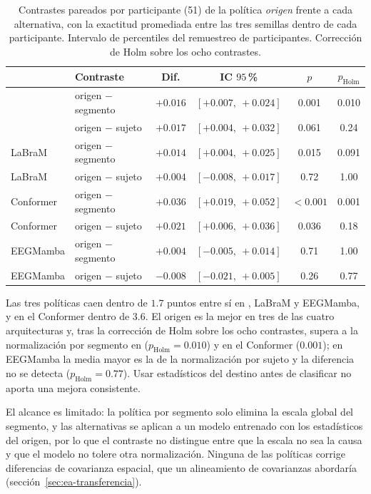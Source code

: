 \begin{table}[H]
\centering
\caption{Contrastes pareados por participante (51) de la política \emph{origen} frente a cada
alternativa, con la exactitud promediada entre las tres semillas dentro de cada participante.
Intervalo de percentiles del remuestreo de participantes. Corrección de Holm sobre los ocho
contrastes.}
\label{tab:politicas-contrastes}
\small
\begin{tabular}{llcccc}
\toprule
 & Contraste & Dif. & IC $95$\,\% & $p$ & $p_{\text{Holm}}$ \\
\midrule
\eegnet{} & origen $-$ segmento & $+0.016$ & $[+0.007,\ +0.024]$ & 0.001 & 0.010 \\
\eegnet{} & origen $-$ sujeto & $+0.017$ & $[+0.004,\ +0.032]$ & 0.061 & 0.24 \\
LaBraM & origen $-$ segmento & $+0.014$ & $[+0.004,\ +0.025]$ & 0.015 & 0.091 \\
LaBraM & origen $-$ sujeto & $+0.004$ & $[-0.008,\ +0.017]$ & 0.72 & 1.00 \\
Conformer & origen $-$ segmento & $+0.036$ & $[+0.019,\ +0.052]$ & $<0.001$ & 0.001 \\
Conformer & origen $-$ sujeto & $+0.021$ & $[+0.006,\ +0.036]$ & 0.036 & 0.18 \\
EEGMamba & origen $-$ segmento & $+0.004$ & $[-0.005,\ +0.014]$ & 0.71 & 1.00 \\
EEGMamba & origen $-$ sujeto & $-0.008$ & $[-0.021,\ +0.005]$ & 0.26 & 0.77 \\
\bottomrule
\end{tabular}
\end{table}

Las tres políticas caen dentro de $1.7$ puntos entre sí en \eegnet{}, LaBraM y EEGMamba, y en el
Conformer dentro de $3.6$. El origen es la mejor en tres de las cuatro arquitecturas y, tras la corrección
de Holm sobre los ocho contrastes, supera a la normalización por segmento en \eegnet{}
($p_{\text{Holm}} = 0.010$) y en el Conformer ($0.001$); en EEGMamba la media mayor es la de la
normalización por sujeto y la diferencia no se detecta ($p_{\text{Holm}} = 0.77$). Usar estadísticos del
destino antes de clasificar no aporta una mejora consistente.

El alcance es limitado: la política por segmento solo elimina la escala global del segmento, y las
alternativas se aplican a un modelo entrenado con los estadísticos del origen, por lo que el contraste no
distingue entre que la escala no sea la causa y que el modelo no tolere otra normalización. Ninguna de las
políticas corrige diferencias de covarianza espacial, que un alineamiento de covarianzas abordaría
\cite{he2020ea,zanini2018} (sección~\ref{sec:ea-transferencia}).

